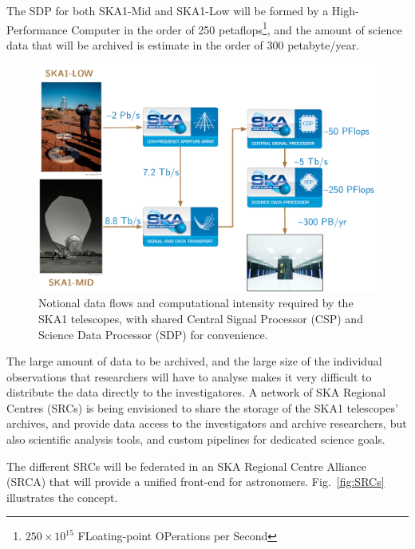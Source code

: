 \documentclass[a4paper,
               biblatex,       %
               keeplastbox,    %
               ]{jacow-2_1}    %
\begin{document}
The SDP for both SKA1-Mid and SKA1-Low will be formed by a High-Performance Computer in the order of 250 petaflops\footnote{$250\times10^{15}$ FLoating-point OPerations per Second}, and the amount of science data that will be archived is estimate in the order of 300 petabyte/year. 

\begin{figure}[!tb]
  \centering
    \includegraphics[width=\columnwidth]{FRAPL01f6}
  \caption{Notional data flows and computational intensity required by the SKA1 telescopes, with shared Central Signal Processor (CSP) and Science Data Processor (SDP) for convenience.}
  \label{fig:SKA1_NotionalDataFlow}
\end{figure}

The large amount of data to be archived, and the large size of the individual observations that researchers will have to analyse makes it very difficult to distribute the data directly to the investigatores. A network of SKA Regional Centres (SRCs) is being envisioned to share the storage of the SKA1 telescopes' archives, and provide data access to the investigators and archive researchers, but also scientific analysis tools, and custom pipelines for dedicated science goals.	

The different SRCs will be federated in an SKA Regional Centre Alliance (SRCA) that will provide a unified front-end for astronomers. Fig.~\ref{fig:SRCs} illustrates the concept.
\end{document}
